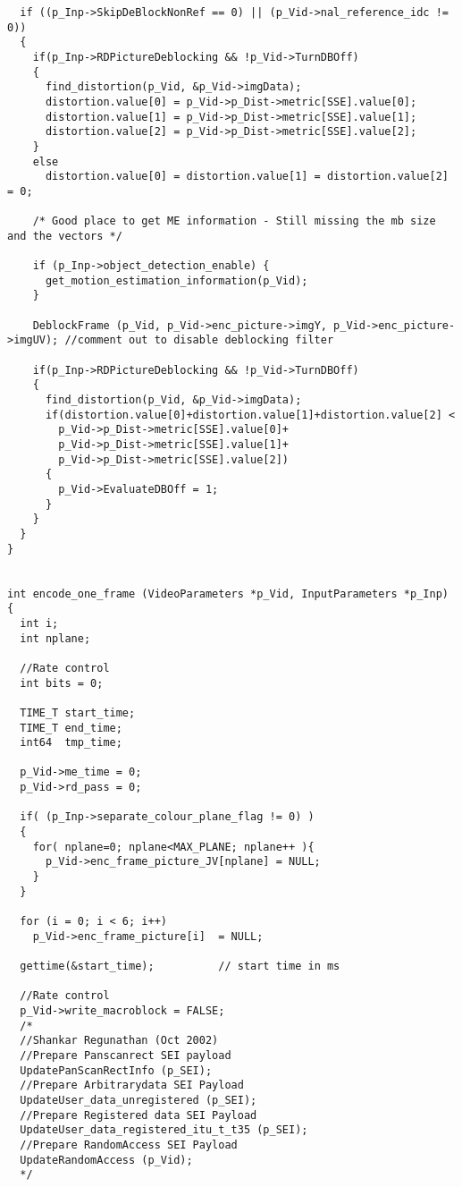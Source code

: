 \begin{lstlisting}
  if ((p_Inp->SkipDeBlockNonRef == 0) || (p_Vid->nal_reference_idc != 0))
  {
    if(p_Inp->RDPictureDeblocking && !p_Vid->TurnDBOff)
    {
      find_distortion(p_Vid, &p_Vid->imgData);
      distortion.value[0] = p_Vid->p_Dist->metric[SSE].value[0];
      distortion.value[1] = p_Vid->p_Dist->metric[SSE].value[1];
      distortion.value[2] = p_Vid->p_Dist->metric[SSE].value[2];
    }
    else
      distortion.value[0] = distortion.value[1] = distortion.value[2] = 0;

    /* Good place to get ME information - Still missing the mb size and the vectors */

    if (p_Inp->object_detection_enable) {
      get_motion_estimation_information(p_Vid);
    }

    DeblockFrame (p_Vid, p_Vid->enc_picture->imgY, p_Vid->enc_picture->imgUV); //comment out to disable deblocking filter

    if(p_Inp->RDPictureDeblocking && !p_Vid->TurnDBOff)
    {
      find_distortion(p_Vid, &p_Vid->imgData);
      if(distortion.value[0]+distortion.value[1]+distortion.value[2] < 
        p_Vid->p_Dist->metric[SSE].value[0]+
        p_Vid->p_Dist->metric[SSE].value[1]+
        p_Vid->p_Dist->metric[SSE].value[2])
      {
        p_Vid->EvaluateDBOff = 1; 
      }
    }
  }
}


int encode_one_frame (VideoParameters *p_Vid, InputParameters *p_Inp)
{
  int i;
  int nplane;

  //Rate control
  int bits = 0;

  TIME_T start_time;
  TIME_T end_time;
  int64  tmp_time;

  p_Vid->me_time = 0;
  p_Vid->rd_pass = 0;

  if( (p_Inp->separate_colour_plane_flag != 0) )
  {
    for( nplane=0; nplane<MAX_PLANE; nplane++ ){
      p_Vid->enc_frame_picture_JV[nplane] = NULL;
    }
  }

  for (i = 0; i < 6; i++)
    p_Vid->enc_frame_picture[i]  = NULL;

  gettime(&start_time);          // start time in ms

  //Rate control
  p_Vid->write_macroblock = FALSE;
  /*
  //Shankar Regunathan (Oct 2002)
  //Prepare Panscanrect SEI payload
  UpdatePanScanRectInfo (p_SEI);
  //Prepare Arbitrarydata SEI Payload
  UpdateUser_data_unregistered (p_SEI);
  //Prepare Registered data SEI Payload
  UpdateUser_data_registered_itu_t_t35 (p_SEI);
  //Prepare RandomAccess SEI Payload
  UpdateRandomAccess (p_Vid);
  */


\end{lstlisting}
